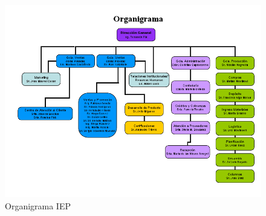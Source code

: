 \begin{figure}[h!]
  \centering
  \includegraphics[scale=0.55]{./Images/organigrama.png}
  \caption{Organigrama IEP}\label{organigramaIEP}
\end{figure}